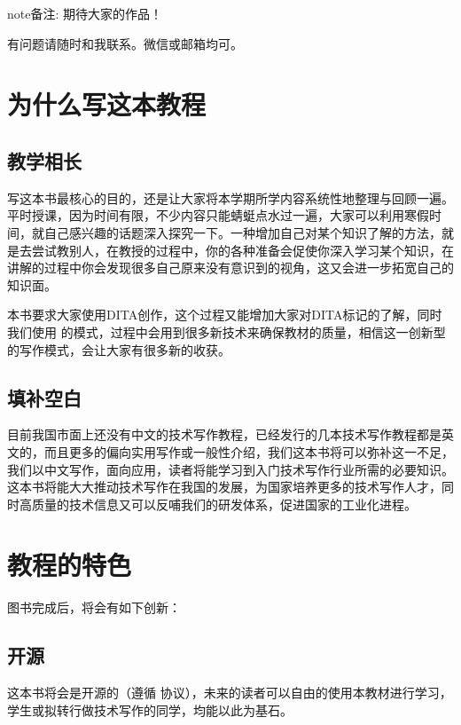 \documentclass[letterpaper,10pt,english]{sphinxmanual}
\begin{document}
\begin{sphinxadmonition}{note}{备注:}
\sphinxAtStartPar
期待大家的作品！

\sphinxAtStartPar
有问题请随时和我联系。微信或邮箱均可。
\end{sphinxadmonition}


\section{为什么写这本教程}
\label{\detokenize{capstone-project/book-authoring:id5}}

\subsection{教学相长}
\label{\detokenize{capstone-project/book-authoring:id6}}
\sphinxAtStartPar
写这本书最核心的目的，还是让大家将本学期所学内容系统性地整理与回顾一遍。平时授课，因为时间有限，不少内容只能蜻蜓点水过一遍，大家可以利用寒假时间，就自己感兴趣的话题深入探究一下。一种增加自己对某个知识了解的方法，就是去尝试教别人，在教授的过程中，你的各种准备会促使你深入学习某个知识，在讲解的过程中你会发现很多自己原来没有意识到的视角，这又会进一步拓宽自己的知识面。

\sphinxAtStartPar
本书要求大家使用DITA创作，这个过程又能增加大家对DITA标记的了解，同时我们使用  的模式，过程中会用到很多新技术来确保教材的质量，相信这一创新型的写作模式，会让大家有很多新的收获。


\subsection{填补空白}
\label{\detokenize{capstone-project/book-authoring:id7}}
\sphinxAtStartPar
目前我国市面上还没有中文的技术写作教程，已经发行的几本技术写作教程都是英文的，而且更多的偏向实用写作或一般性介绍，我们这本书将可以弥补这一不足，我们以中文写作，面向应用，读者将能学习到入门技术写作行业所需的必要知识。这本书将能大大推动技术写作在我国的发展，为国家培养更多的技术写作人才，同时高质量的技术信息又可以反哺我们的研发体系，促进国家的工业化进程。


\section{教程的特色}
\label{\detokenize{capstone-project/book-authoring:id8}}
\sphinxAtStartPar
图书完成后，将会有如下创新：


\subsection{开源}
\label{\detokenize{capstone-project/book-authoring:id9}}
\sphinxAtStartPar
这本书将会是开源的（遵循    协议），未来的读者可以自由的使用本教材进行学习，学生或拟转行做技术写作的同学，均能以此为基石。
\end{document}
